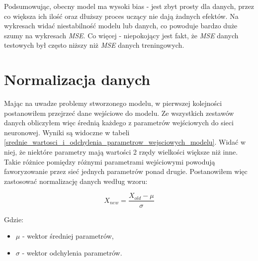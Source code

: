 \documentclass[12pt]{aghdpl}
\begin{document}
		Podsumowując, obecny model ma wysoki bias - jest zbyt prosty dla danych, przez co większa ich ilość oraz dłuższy proces uczący nie dają żadnych efektów. Na wykresach widać niestabilność modelu lub danych, co powoduje bardzo duże szumy na wykresach \textit{MSE}. Co więcej - niepokojący jest fakt, że \textit{MSE} danych testowych był często niższy niż \textit{MSE} danych treningowych.
		
		\section{Normalizacja danych} \label{normalizacja_danych}
		Mając na uwadze problemy stworzonego modelu, w pierwszej kolejności postanowiłem przejrzeć dane wejściowe do modelu. Ze wszystkich zestawów danych obliczyłem więc średnią każdego z parametrów wejściowych do sieci neuronowej. Wyniki są widoczne w tabeli \ref{srednie_wartosci_i_odchylenia_parametrow_wejsciowych_modelu}. Widać w niej, że niektóre parametry mają wartości 2 rzędy wielkości większe niż inne. Takie różnice pomiędzy różnymi parametrami wejściowymi powodują faworyzowanie przez sieć jednych parametrów ponad drugie. Postanowiłem więc zastosować normalizację danych według wzoru:
		
		\begin{equation}
		X_{new} = \frac{X_{old} - \mu}{\sigma}
		\end{equation}		 
		
		Gdzie:
		\begin{itemize}
		\item $\mu$ - wektor średniej parametrów,
		\item $\sigma$ - wektor odchylenia parametrów.
		\end{itemize}
		
\end{document}
